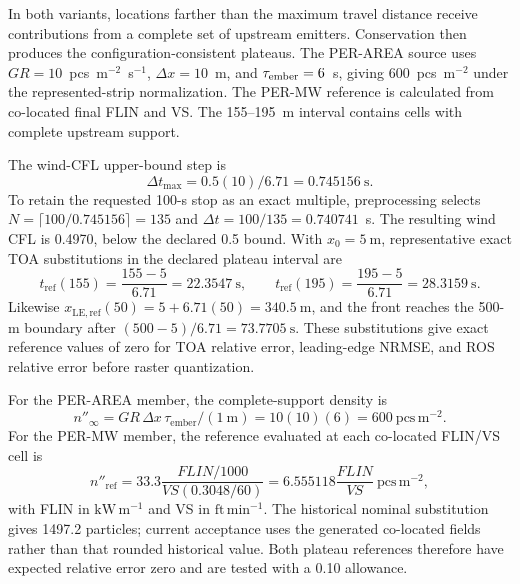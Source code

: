 In both variants, locations farther than the maximum travel distance receive
contributions from a complete set of upstream emitters. Conservation then produces
the configuration-consistent plateaus. The PER-AREA source uses
$GR=10$~pcs~m$^{-2}$~s$^{-1}$, $\Delta x=10$~m, and
$\tau_{\rm ember}=6$~s, giving 600~pcs~m$^{-2}$ under the represented-strip
normalization. The PER-MW reference is calculated from co-located final FLIN
and VS. The 155--195~m interval contains cells with complete upstream support.

The wind-CFL upper-bound step is
\[
 \Delta t_{\max}=0.5(10)/6.71=0.745156~\mathrm{s}.
\]
To retain the requested 100-s stop as an exact multiple, preprocessing selects \(N=\lceil100/0.745156\rceil=135\) and \(\Delta t=100/135=0.740741\)~s. The resulting wind CFL is 0.4970, below the declared 0.5 bound.
With \(x_0=5~\mathrm{m}\), representative exact TOA substitutions in the
declared plateau interval are
\[
 t_{\mathrm{ref}}(155)=\frac{155-5}{6.71}=22.3547~\mathrm{s},\qquad
 t_{\mathrm{ref}}(195)=\frac{195-5}{6.71}=28.3159~\mathrm{s}.
\]
Likewise \(x_{\mathrm{LE,ref}}(50)=5+6.71(50)=340.5~\mathrm{m}\), and the
front reaches the 500-m boundary after
\((500-5)/6.71=73.7705~\mathrm{s}\).  These substitutions give exact
reference values of zero for TOA relative error, leading-edge NRMSE, and ROS
relative error before raster quantization.

For the PER-AREA member, the complete-support density is
\[
 n''_{\infty}=GR\,\Delta x\,\tau_{\mathrm{ember}}/(1~\mathrm{m})
 =10(10)(6)=600~\mathrm{pcs\,m^{-2}}.
\]
For the PER-MW member, the reference evaluated at each co-located FLIN/VS
cell is
\[
 n''_{\mathrm{ref}}
 =33.3\frac{FLIN/1000}{VS(0.3048/60)}
 =6.555118\frac{FLIN}{VS}~\mathrm{pcs\,m^{-2}},
\]
with FLIN in \(\mathrm{kW\,m^{-1}}\) and VS in
\(\mathrm{ft\,min^{-1}}\).  The historical nominal substitution gives
1497.2 particles; current acceptance uses the generated co-located fields
rather than that rounded historical value.  Both plateau references therefore
have expected relative error zero and are tested with a 0.10 allowance.

